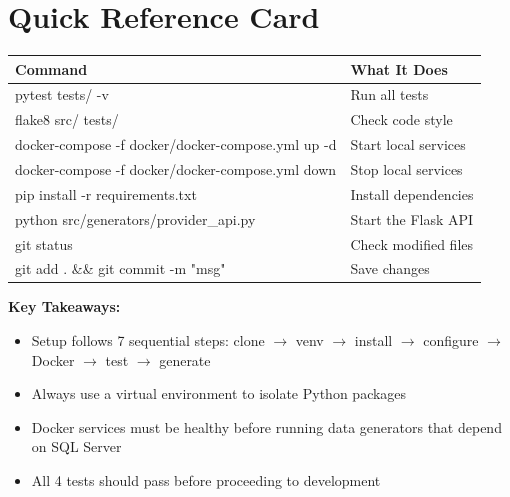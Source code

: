 \documentclass[12pt, a4paper, oneside]{report}
\begin{document}
\section{Quick Reference Card}

\begin{center}
\begin{tabular}{>{\ttfamily\small}p{7cm} p{6cm}}
    \toprule
    \normalfont\textbf{Command} & \textbf{What It Does} \\
    \midrule
    pytest tests/ -v & Run all tests \\
    flake8 src/ tests/ & Check code style \\
    docker-compose -f docker/\newline docker-compose.yml up -d & Start local services \\
    docker-compose -f docker/\newline docker-compose.yml down & Stop local services \\
    pip install -r requirements.txt & Install dependencies \\
    python src/generators/\newline provider\_api.py & Start the Flask API \\
    git status & Check modified files \\
    git add . \&\& git commit -m "msg" & Save changes \\
    \bottomrule
\end{tabular}
\end{center}

\begin{summarybox}
\textbf{Key Takeaways:}
\begin{itemize}
    \item Setup follows 7 sequential steps: clone $\rightarrow$ venv $\rightarrow$ install $\rightarrow$ configure $\rightarrow$ Docker $\rightarrow$ test $\rightarrow$ generate
    \item Always use a virtual environment to isolate Python packages
    \item Docker services must be healthy before running data generators that depend on SQL Server
    \item All 4 tests should pass before proceeding to development
\end{itemize}
\end{summarybox}


\end{document}
